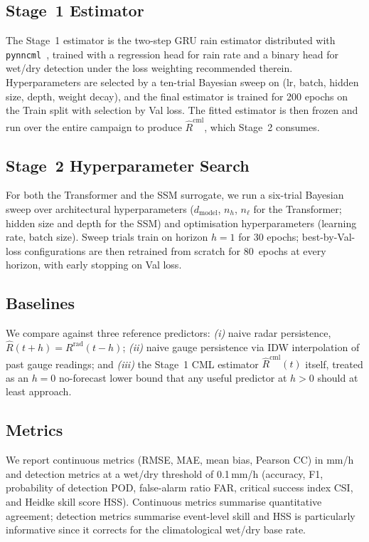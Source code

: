 \documentclass[conference]{IEEEtran}
\begin{document}
\subsection{Stage~1 Estimator}

The Stage~1 estimator is the two-step GRU rain estimator distributed
with \texttt{pynncml}~\cite{pynncml}, trained with a regression head for
rain rate and a binary head for wet/dry detection under the loss
weighting recommended therein. Hyperparameters are selected by a
ten-trial Bayesian sweep on (lr, batch, hidden size, depth, weight
decay), and the final estimator is trained for 200 epochs on the Train
split with selection by Val loss. The fitted estimator is then frozen
and run over the entire campaign to produce
$\widehat{R}^{\mathrm{cml}}$, which Stage~2 consumes.

\subsection{Stage~2 Hyperparameter Search}

For both the Transformer and the SSM surrogate, we run a six-trial
Bayesian sweep over architectural hyperparameters
($d_{\mathrm{model}}$, $n_h$, $n_\ell$ for the Transformer; hidden size
and depth for the SSM) and optimisation hyperparameters (learning rate,
batch size). Sweep trials train on horizon $h=1$ for 30 epochs;
best-by-Val-loss configurations are then retrained from scratch for
80~epochs at every horizon, with early stopping on Val loss.

\subsection{Baselines}

We compare against three reference predictors: \emph{(i)} naive radar
persistence, $\widehat{R}(t+h)=R^{\mathrm{rad}}(t-h)$;
\emph{(ii)} naive gauge persistence via IDW interpolation of past gauge
readings; and \emph{(iii)} the Stage~1 CML estimator $\widehat{R}^{\mathrm{cml}}(t)$
itself, treated as an $h=0$ no-forecast lower bound that any useful
predictor at $h>0$ should at least approach.

\subsection{Metrics}

We report continuous metrics (RMSE, MAE, mean bias, Pearson CC) in
mm/h and detection metrics at a wet/dry threshold of 0.1\,mm/h
(accuracy, F1, probability of detection POD, false-alarm ratio FAR,
critical success index CSI, and Heidke skill score HSS). Continuous
metrics summarise quantitative agreement; detection metrics summarise
event-level skill and HSS is particularly informative since it corrects
for the climatological wet/dry base rate.
\end{document}
